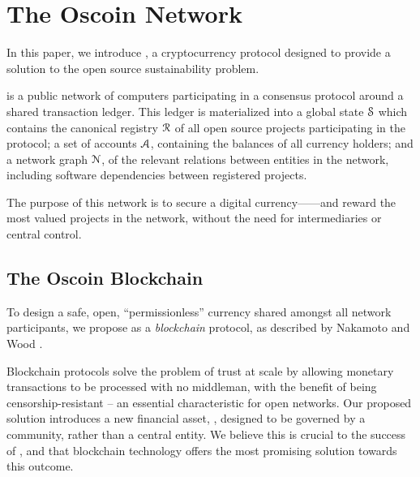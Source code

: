\section{The Oscoin Network}
\label{s:oscoin}

\noindent In this paper, we introduce \oscoin{}, a cryptocurrency protocol
designed to provide a solution to the open source sustainability problem.

\Oscoin{} is a public network of computers participating in a consensus
protocol around a shared transaction ledger.
This ledger is materialized into a global state $\mathcal{S}$ which
contains the canonical registry $\mathcal{R}$ of all open source
projects participating in the protocol; a set of accounts
$\mathcal{A}$, containing the balances of all currency holders; and
a network graph $\mathcal{N}$, of the relevant relations between
entities in the network, including software dependencies between registered projects.

The purpose of this network is to secure a digital currency---\oscoin{}---and
reward the most valued projects in the network, without the need
for intermediaries or central control.

\subsection{The Oscoin Blockchain}

To design a safe, open, ``permissionless'' currency shared amongst all network
participants, we propose \oscoin{} as a \emph{blockchain} protocol, as
described by Nakamoto \cite{bitcoin} and Wood \cite{ethereum}.

Blockchain protocols solve the problem of trust at scale by allowing monetary
transactions to be processed with no middleman, with the benefit of being
censorship-resistant -- an essential characteristic for open networks. Our
proposed solution introduces a new financial asset, \oscoin{}, designed to be
governed by a community, rather than a central entity. We believe this
is crucial to the success of \oscoin{}, and that blockchain technology offers
the most promising solution towards this outcome.

